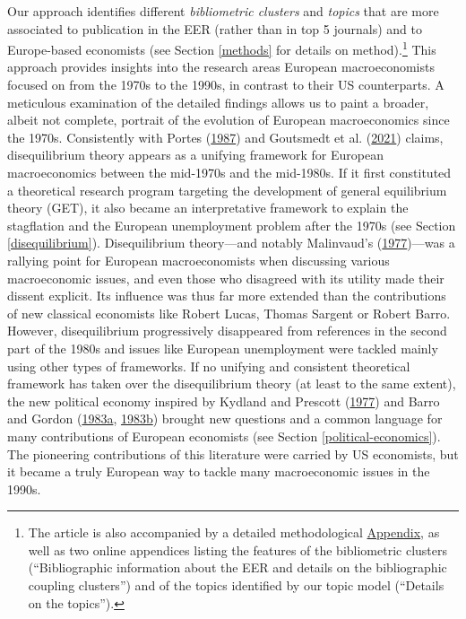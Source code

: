 \documentclass[
  12pt,
  onecolumn]{article}
\begin{document}
Our approach identifies different \emph{bibliometric clusters} and
\emph{topics} that are more associated to publication in the EER (rather
than in top 5 journals) and to Europe-based economists (see Section
\ref{methods} for details on method).\footnote{The article is also
  accompanied by a detailed methodological
  \protect\hyperlink{appendix}{Appendix}, as well as two online
  appendices listing the features of the bibliometric clusters
  (``Bibliographic information about the EER and details on the
  bibliographic coupling clusters'') and of the topics identified by our
  topic model (``Details on the topics'').} This approach provides
insights into the research areas European macroeconomists focused on
from the 1970s to the 1990s, in contrast to their US counterparts. A
meticulous examination of the detailed findings allows us to paint a
broader, albeit not complete, portrait of the evolution of European
macroeconomics since the 1970s. Consistently with Portes
(\protect\hyperlink{ref-portes1987}{1987}) and Goutsmedt et al.
(\protect\hyperlink{ref-goutsmedt2021}{2021}) claims, disequilibrium
theory appears as a unifying framework for European macroeconomics
between the mid-1970s and the mid-1980s. If it first constituted a
theoretical research program targeting the development of general
equilibrium theory (GET), it also became an interpretative framework to
explain the stagflation and the European unemployment problem after the
1970s (see Section \ref{disequilibrium}). Disequilibrium theory---and
notably Malinvaud's (\protect\hyperlink{ref-malinvaud1977}{1977})---was
a rallying point for European macroeconomists when discussing various
macroeconomic issues, and even those who disagreed with its utility made
their dissent explicit. Its influence was thus far more extended than
the contributions of new classical economists like Robert Lucas, Thomas
Sargent or Robert Barro. However, disequilibrium progressively
disappeared from references in the second part of the 1980s and issues
like European unemployment were tackled mainly using other types of
frameworks. If no unifying and consistent theoretical framework has
taken over the disequilibrium theory (at least to the same extent), the
new political economy inspired by Kydland and Prescott
(\protect\hyperlink{ref-kydland1977}{1977}) and Barro and Gordon
(\protect\hyperlink{ref-barro1983}{1983a},
\protect\hyperlink{ref-barro1983c}{1983b}) brought new questions and a
common language for many contributions of European economists (see
Section \ref{political-economics}). The pioneering contributions of this
literature were carried by US economists, but it became a truly European
way to tackle many macroeconomic issues in the 1990s.
\end{document}
